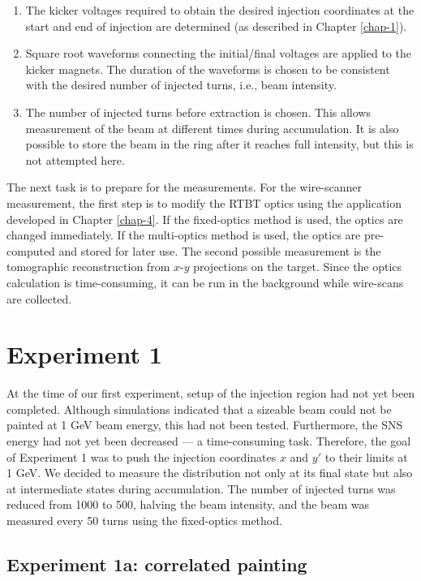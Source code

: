 \begin{enumerate}
    \item
    The kicker voltages required to obtain the desired injection coordinates at the start and end of injection are determined (as described in Chapter \ref{chap-1}).
    \item
    Square root waveforms connecting the initial/final voltages are applied to the kicker magnets. The duration of the waveforms is chosen to be consistent with the desired number of injected turns, i.e., beam intensity.
    \item
    The number of injected turns before extraction is chosen. This allows measurement of the beam at different times during accumulation. It is also possible to store the beam in the ring after it reaches full intensity, but this is not attempted here.
\end{enumerate}
%
The next task is to prepare for the measurements. For the wire-scanner measurement, the first step is to modify the RTBT optics using the application developed in Chapter \ref{chap-4}. If the fixed-optics method is used, the optics are changed immediately. If the multi-optics method is used, the optics are pre-computed and stored for later use. The second possible measurement is the tomographic reconstruction from $x$-$y$ projections on the target. Since the optics calculation is time-consuming, it can be run in the background while wire-scans are collected.


\section{Experiment 1}

At the time of our first experiment, setup of the injection region had not yet been completed. Although simulations indicated that a sizeable beam could not be painted at 1 GeV beam energy, this had not been tested. Furthermore, the SNS energy had not yet been decreased — a time-consuming task. Therefore, the goal of Experiment 1 was to push the injection coordinates $x$ and $y'$ to their limits at 1 GeV. We decided to measure the distribution not only at its final state but also at intermediate states during accumulation. The number of injected turns was reduced from 1000 to 500, halving the beam intensity, and the beam was measured every 50 turns using the fixed-optics method.


\subsection{Experiment 1a: correlated painting}

